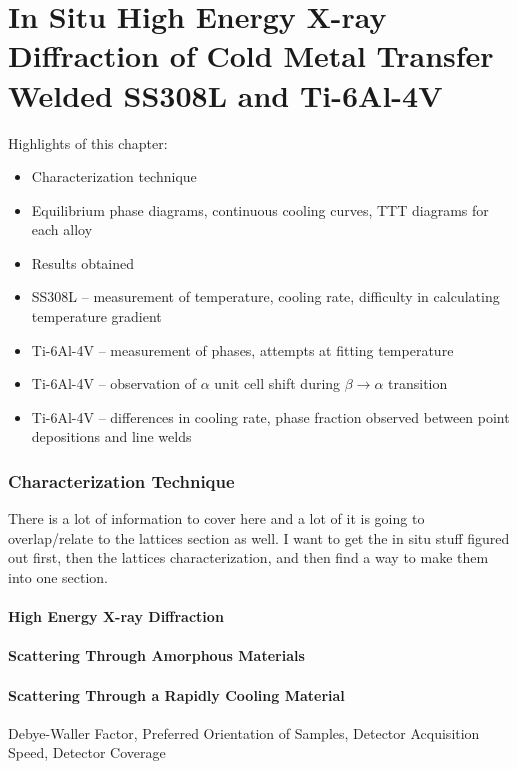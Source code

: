 \chapter{In Situ High Energy X-ray Diffraction of Cold Metal Transfer Welded SS308L and Ti-6Al-4V}
Highlights of this chapter:
\begin{itemize}
	\item Characterization technique
	\item Equilibrium phase diagrams, continuous cooling curves, TTT diagrams for each alloy
	\item Results obtained
	\item SS308L -- measurement of temperature, cooling rate, difficulty in calculating temperature gradient
	\item Ti-6Al-4V -- measurement of phases, attempts at fitting temperature
	\item Ti-6Al-4V -- observation of $\alpha$ unit cell shift during $\beta \to \alpha$ transition
	\item Ti-6Al-4V -- differences in cooling rate, phase fraction observed between point depositions and line welds
\end{itemize}

\subsection{Characterization Technique}
There is a lot of information to cover here and a lot of it is going to overlap/relate to the lattices section as well. I want to get the in situ stuff figured out first, then the lattices characterization, and then find a way to make them into one section.

\subsubsection{High Energy X-ray Diffraction}

\subsubsection{Scattering Through Amorphous Materials}

\subsubsection{Scattering Through a Rapidly Cooling Material}
Debye-Waller Factor, Preferred Orientation of Samples, Detector Acquisition Speed, Detector Coverage

